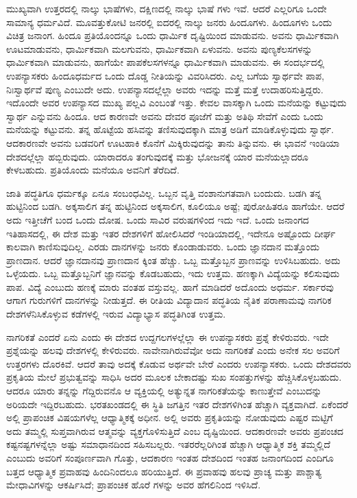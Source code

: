 ಮುಖ್ಯವಾಗಿ ಉತ್ತರದಲ್ಲಿ ನಾಲ್ಕು ಭಾಷೆಗಳು, ದಕ್ಷಿಣದಲ್ಲಿ ನಾಲ್ಕು ಭಾಷೆ ಗಳು ಇವೆ. ಆದರೆ ಎಲ್ಲರಿಗೂ ಒಂದೇ ಸಾಮಾನ್ಯ ಧರ್ಮವಿದೆ. ಮೂವತ್ತುಕೋಟಿ ಜನರಲ್ಲಿ ಐದರಲ್ಲಿ ನಾಲ್ಕು ಜನರು ಹಿಂದೂಗಳು. ಹಿಂದೂಗಳು ಒಂದು ವಿಚಿತ್ರ ಜನಾಂಗ. ಹಿಂದೂ ಪ್ರತಿಯೊಂದನ್ನೂ ಒಂದು ಧಾರ್ಮಿಕ ದೃಷ್ಟಿಯಿಂದ ಮಾಡುವನು. ಅವನು ಧಾರ್ಮಿಕವಾಗಿ ಊಟಮಾಡುವನು, ಧಾರ್ಮಿಕವಾಗಿ ಮಲಗುವನು, ಧಾರ್ಮಿಕವಾಗಿ ಏಳುವನು. ಅವನು ಪುಣ್ಯಕೆಲಸಗಳನ್ನು ಧಾರ್ಮಿಕವಾಗಿ ಮಾಡುವನು, ಹಾಗೆಯೇ ಪಾಪಕೆಲಸಗಳನ್ನೂ ಧಾರ್ಮಿಕವಾಗಿ ಮಾಡುವನು. ಈ ಸಂದರ್ಭದಲ್ಲಿ ಉಪನ್ಯಾಸಕರು ಹಿಂದೂಧರ್ಮದ ಒಂದು ದೊಡ್ಡ ನೀತಿಯನ್ನು ವಿವರಿಸಿದರು. ಎಲ್ಲ ಬಗೆಯ ಸ್ವಾರ್ಥವೇ ಪಾಪ, ನಿಃಸ್ವಾರ್ಥವೆ ಪುಣ್ಯ ಎಂಬುದೇ ಅದು. ಉಪನ್ಯಾಸದಲ್ಲೆಲ್ಲಾ ಅವರು ಇದನ್ನು ಮತ್ತೆ ಮತ್ತೆ ಉದಾಹರಿಸುತ್ತಿದ್ದರು. ಇದೊಂದೇ ಅವರ ಉಪನ್ಯಾಸದ ಮುಖ್ಯ ಪಲ್ಲವಿ ಎಂಬಂತೆ ಇತ್ತು. ಕೇವಲ ವಾಸಕ್ಕಾಗಿ ಒಂದು ಮನೆಯನ್ನು ಕಟ್ಟುವುದು ಸ್ವಾರ್ಥ ಎನ್ನುವನು ಹಿಂದೂ. ಆದ ಕಾರಣವೇ ಅವನು ದೇವರ ಪೂಜೆಗೆ ಮತ್ತು ಅತಿಥಿ ಸೇವೆಗೆ ಎಂದು ಒಂದು ಮನೆಯನ್ನು ಕಟ್ಟುವನು. ತನ್ನ ಹೊಟ್ಟೆಯ ಹಸಿವನ್ನು ತಣಿಸುವುದಕ್ಕಾಗಿ ಮಾತ್ರ ಅಡಿಗೆ ಮಾಡಿಕೊಳ್ಳುವುದು ಸ್ವಾರ್ಥ. ಆದಕಾರಣವೇ ಅವನು ಬಡವರಿಗೆ ಊಟಹಾಕಿ ಕೊನೆಗೆ ಮಿಕ್ಕಿರುವುದನ್ನು ತಾನು ತಿನ್ನುವನು. ಈ ಭಾವನೆ ಇಂಡಿಯಾ ದೇಶದಲ್ಲೆಲ್ಲಾ ಹಬ್ಬಿರುವುದು. ಯಾರಾದರೂ ತಂಗುವುದಕ್ಕೆ ಮತ್ತು ಭೋಜನಕ್ಕೆ ಯಾರ ಮನೆಯಲ್ಲಾದರೂ ಕೇಳಬಹುದು. ಪ್ರತಿಯೊಂದು ಮನೆಯೂ ಅವನಿಗೆ ತೆರೆದಿದೆ.

ಜಾತಿ ಪದ್ಧತಿಗೂ ಧರ್ಮಕ್ಕೂ ಏನೂ ಸಂಬಂಧವಿಲ್ಲ. ಒಬ್ಬನ ವೃತ್ತಿ ವಂಶಾನುಗತವಾಗಿ ಬಂದುದು. ಬಡಗಿ ತನ್ನ ಹುಟ್ಟಿನಿಂದ ಬಡಗಿ. ಅಕ್ಕಸಾಲಿಗ ತನ್ನ ಹುಟ್ಟಿನಿಂದ ಅಕ್ಕಸಾಲಿಗ, ಕೂಲಿಯೂ ಅಷ್ಟೆ; ಪುರೋಹಿತರೂ ಹಾಗೆಯೇ. ಆದರೆ ಅದು ಇತ್ತೀಚೆಗೆ ಬಂದ ಒಂದು ದೋಷ. ಒಂದು ಸಾವಿರ ವರುಷಗಳಿಂದ ಇದು ಇದೆ. ಒಂದು ಜನಾಂಗದ ಇತಿಹಾಸದಲ್ಲಿ, ಈ ದೇಶ ಮತ್ತು ಇತರ ದೇಶಗಳಿಗೆ ಹೋಲಿಸಿದರೆ ಇಂಡಿಯಾದಲ್ಲಿ, ಇದೇನೂ ಅಷ್ಟೊಂದು ದೀರ್ಘ ಕಾಲವಾಗಿ ಕಾಣಿಸುವುದಿಲ್ಲ. ಎರಡು ದಾನಗಳನ್ನು ಜನರು ಕೊಂಡಾಡುವರು. ಒಂದು ಜ್ಞಾನದಾನ ಮತ್ತೊಂದು ಪ್ರಾಣದಾನ. ಆದರೆ ಜ್ಞಾನದಾನವು ಪ್ರಾಣದಾನ ಕ್ಕಿಂತ ಹೆಚ್ಚು. ಒಬ್ಬ ಮತ್ತೊಬ್ಬನ ಪ್ರಾಣವನ್ನು ಉಳಿಸಿಬಹುದು. ಅದು ಒಳ್ಳೆಯದು. ಒಬ್ಬ ಮತ್ತೊಬ್ಬನಿಗೆ ಜ್ಞಾನವನ್ನು ಕೊಡಬಹುದು, ಇದು ಉತ್ತಮ. ಹಣಕ್ಕಾಗಿ ವಿದ್ಯೆಯನ್ನು ಕಲಿಸುವುದು ಪಾಪ. ವಿದ್ಯೆ ಎಂಬುದು ಹಣಕ್ಕೆ ಮಾರು ವಂತಹ ವಸ್ತುವಲ್ಲ. ಹಾಗೆ ಮಾಡಿದರೆ ಅದೊಂದು ಅಧರ್ಮ. ಸರ್ಕಾರವು ಆಗಾಗ ಗುರುಗಳಿಗೆ ದಾನಗಳನ್ನು ನೀಡುತ್ತದೆ. ಈ ರೀತಿಯ ವಿದ್ಯಾದಾನ ಪದ್ಧತಿಯ ನೈತಿಕ ಪರಾಣಾಮವು ನಾಗರಿಕ ದೇಶಗಳೆನಿಸಿಕೊಳ್ಳುವ ಕಡೆಗಳಲ್ಲಿ ಇರುವ ವಿದ್ಯಾಭ್ಯಾಸ ಪದ್ಧತಿಗಿಂತ ಉತ್ತಮ.

ನಾಗರಿಕತೆ ಎಂದರೆ ಏನು ಎಂದು ಈ ದೇಶದ ಉದ್ದಗಲಗಳಲ್ಲೆಲ್ಲಾ ಈ ಉಪನ್ಯಾಸಕರು ಪ್ರಶ್ನೆ ಕೇಳಿರುವರು. ಇದೇ ಪ್ರಶ್ನೆಯನ್ನು ಹಲವು ದೇಶಗಳಲ್ಲಿ ಕೇಳಿರುವರು. ನಾವೇನಾಗಿರುವೆವೋ ಅದು ನಾಗರಿಕತೆ ಎಂದು ಅನೇಕ ಸಲ ಅವರಿಗೆ ಉತ್ತರಗಳು ದೊರಕಿವೆ. ಆದರೆ ತಾವು ಅದಕ್ಕೆ ಕೊಡುವ ಅರ್ಥವೇ ಬೇರೆ ಎಂದರು ಉಪನ್ಯಾಸಕರು. ಒಂದು ದೇಶದವರು ಪ್ರಕೃತಿಯ ಮೇಲೆ ಪ್ರಭುತ್ವವನ್ನು ಸಾಧಿಸಿ ಅದರ ಮೂಲಕ ಬೇಕಾದಷ್ಟು ಸುಖ ಸಂಪತ್ತುಗಳನ್ನು ಹೆಚ್ಚಿಸಿಕೊಳ್ಳಬಹುದು. ಆದರೂ ಯಾರು ತನ್ನನ್ನು ಗೆದ್ದಿರುವನೊ ಆ ವ್ಯಕ್ತಿಯಲ್ಲಿ ಅತ್ಯುನ್ನತ ನಾಗರಿಕತೆಯನ್ನು ಕಾಣುತ್ತೇವೆ ಎಂಬುದನ್ನು ಅರಿಯದೇ ಇದ್ದಿರಬಹುದು. ಭರತಖಂಡದಲ್ಲಿ ಈ ಸ್ಥಿತಿ ಜಗತ್ತಿನ ಇತರ ದೇಶಗಳಿಗಿಂತ ಹೆಚ್ಚಾಗಿ ವ್ಯಕ್ತವಾಗಿದೆ. ಏಕೆಂದರೆ ಅಲ್ಲಿ ಪ್ರಾಪಂಚಿಕ ವಿಷಯಗಳೆಲ್ಲ ಆಧ್ಯಾತ್ಮಿಕಕ್ಕೆ ಅಧೀನ. ಅಲ್ಲಿ ಅವರು ಪ್ರಕೃತಿಯನ್ನು ನೋಡುವುದು ಎಷ್ಟರ ಮಟ್ಟಿಗೆ ಅದು ತಮ್ಮಲ್ಲಿ ಸುಪ್ತವಾಗಿರುವ ಆತ್ಮವನ್ನು ವ್ಯಕ್ತಗೊಳಿಸುತ್ತಿದೆ ಎಂಬ ದೃಷ್ಟಿಯಿಂದ. ಆದಕಾರಣವೇ ಅವರು ಪ್ರಪಂಚದ ಕಷ್ಟನಷ್ಟಗಳನ್ನೆಲ್ಲಾ ಅಷ್ಟು ಸಮಾಧಾನದಿಂದ ಸಹಿಸಬಲ್ಲರು. ಇತರರೆಲ್ಲರಿಗಿಂತ ಹೆಚ್ಚಾಗಿ ಆಧ್ಯಾತ್ಮಿಕ ಶಕ್ತಿ ತಮ್ಮಲ್ಲಿದೆ ಎಂಬುದು ಅವರಿಗೆ ಸಂಪೂರ್ಣವಾಗಿ ಗೊತ್ತು, ಆದಕಾರಣ ಇಂತಹ ದೇಶದಿಂದ ಇಂತಹ ಜನಾಂಗದಿಂದ ಎಂದಿಗೂ ಬತ್ತದ ಆಧ್ಯಾತ್ಮಿಕ ಪ್ರವಾಹವು ಹಿಂದಿನಿಂದಲೂ ಹರಿಯುತ್ತಿದೆ. ಈ ಪ್ರವಾಹವು ಹಲವು ಪ್ರಾಚ್ಯ ಮತ್ತು ಪಾಶ್ಚಾತ್ಯ ಮೇಧಾವಿಗಳನ್ನು ಆಕರ್ಷಿಸಿದೆ; ಪ್ರಾಪಂಚಿಕ ಹೊರೆ ಗಳನ್ನು ಅವರ ಹೆಗಲಿನಿಂದ ಇಳಿಸಿದೆ.

